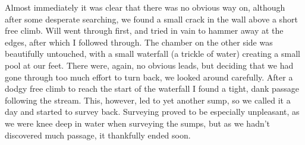 Almost immediately it was clear that there was no obvious way on, although after some desperate searching, we found a small crack in the wall above a short free climb. Will went through first, and tried in vain to hammer away at the edges, after which I followed through. The chamber on the other side was beautifully untouched, with a small waterfall (a trickle of water) creating a small pool at our feet. There were, again, no obvious leads, but deciding that we had gone through too much effort to turn back, we looked around carefully. After a dodgy free climb to reach the start of the waterfall I found a tight, dank passage following the stream. This, however, led to yet another sump, so we called it a day and started to survey back. 
Surveying proved to be especially unpleasant, as we were knee deep in water when surveying the sumps, but as we hadn't discovered much passage, it thankfully ended soon.
